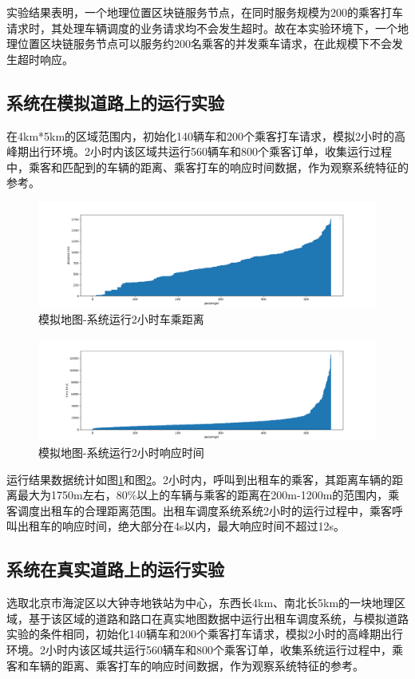 实验结果表明，一个地理位置区块链服务节点，在同时服务规模为200的乘客打车请求时，其处理车辆调度的业务请求均不会发生超时。故在本实验环境下，一个地理位置区块链服务节点可以服务约200名乘客的并发乘车请求，在此规模下不会发生超时响应。

\subsection{系统在模拟道路上的运行实验}
在4km*5km的区域范围内，初始化140辆车和200个乘客打车请求，模拟2小时的高峰期出行环境。2小时内该区域共运行560辆车和800个乘客订单，收集运行过程中，乘客和匹配到的车辆的距离、乘客打车的响应时间数据，作为观察系统特征的参考。

\begin{figure}[h]
  \centering
  \includegraphics[width=1.0\textwidth]{figures/2hDistance}
  \caption{模拟地图-系统运行2小时车乘距离}\label{fig:2hDistance}
\end{figure}

\begin{figure}[h]
  \centering
  \includegraphics[width=1.0\textwidth]{figures/2hTime}
  \caption{模拟地图-系统运行2小时响应时间}\label{fig:2hTime}
\end{figure}

运行结果数据统计如图\ref{fig:2hDistance}和图\ref{fig:2hTime}。2小时内，呼叫到出租车的乘客，其距离车辆的距离最大为1750m左右，80$\%$以上的车辆与乘客的距离在200m-1200m的范围内，乘客调度出租车的合理距离范围。出租车调度系统系统2小时的运行过程中，乘客呼叫出租车的响应时间，绝大部分在4s以内，最大响应时间不超过12s。

\subsection{系统在真实道路上的运行实验}
选取北京市海淀区以大钟寺地铁站为中心，东西长4km、南北长5km的一块地理区域，基于该区域的道路和路口在真实地图数据中运行出租车调度系统，与模拟道路实验的条件相同，初始化140辆车和200个乘客打车请求，模拟2小时的高峰期出行环境。2小时内该区域共运行560辆车和800个乘客订单，收集系统运行过程中，乘客和车辆的距离、乘客打车的响应时间数据，作为观察系统特征的参考。

